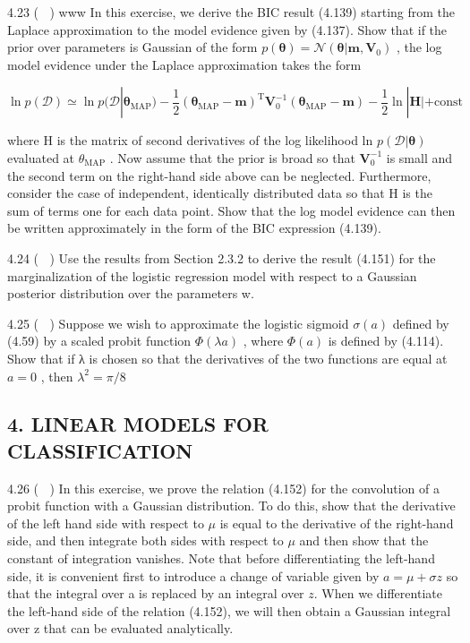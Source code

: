 \documentclass[
  10
]{article}
\begin{document}
4.23 ( ) www In this exercise, we derive the BIC result (4.139) starting
from the Laplace approximation to the model evidence given by (4.137).
Show that if the prior over parameters is Gaussian of the form
\(p ( \pmb \theta ) = \mathcal { N } ( \pmb \theta | \mathbf { m } , \mathbf { V } _ { 0 } )\)
, the log model evidence under the Laplace approximation takes the form

\[
\ln p (\mathcal {D}) \simeq \ln p (\mathcal {D} | \boldsymbol {\theta} _ {\mathrm{MAP}}) - \frac {1}{2} (\boldsymbol {\theta} _ {\mathrm{MAP}} - \mathbf {m}) ^ {\mathrm{T}} \mathbf {V} _ {0} ^ {- 1} (\boldsymbol {\theta} _ {\mathrm{MAP}} - \mathbf {m}) - \frac {1}{2} \ln | \mathbf {H} | + \text {const}
\]

where H is the matrix of second derivatives of the log likelihood ln
\(p ( \mathcal { D } | \mathbf { \theta } )\) evaluated at
\(\theta _ { \mathrm { M A P } }\) . Now assume that the prior is broad
so that \(\mathbf { V } _ { 0 } ^ { - 1 }\) is small and the second term
on the right-hand side above can be neglected. Furthermore, consider the
case of independent, identically distributed data so that H is the sum
of terms one for each data point. Show that the log model evidence can
then be written approximately in the form of the BIC expression (4.139).

4.24 ( ) Use the results from Section 2.3.2 to derive the result (4.151)
for the marginalization of the logistic regression model with respect to
a Gaussian posterior distribution over the parameters w.

4.25 ( ) Suppose we wish to approximate the logistic sigmoid
\(\sigma ( a )\) defined by (4.59) by a scaled probit function
\(\Phi ( \lambda a )\) , where \(\Phi ( a )\) is defined by (4.114).
Show that if λ is chosen so that the derivatives of the two functions
are equal at \(a = 0\) , then \(\lambda ^ { 2 } = \pi / 8\)

\subsection{4. LINEAR MODELS FOR
CLASSIFICATION}\label{linear-models-for-classification}

4.26 ( ) In this exercise, we prove the relation (4.152) for the
convolution of a probit function with a Gaussian distribution. To do
this, show that the derivative of the left hand side with respect to
\(\mu\) is equal to the derivative of the right-hand side, and then
integrate both sides with respect to \(\mu\) and then show that the
constant of integration vanishes. Note that before differentiating the
left-hand side, it is convenient first to introduce a change of variable
given by \(a = \mu + \sigma z\) so that the integral over a is replaced
by an integral over \(z .\) When we differentiate the left-hand side of
the relation (4.152), we will then obtain a Gaussian integral over z
that can be evaluated analytically.
\end{document}
